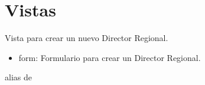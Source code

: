 \documentclass[letterpaper,10pt,spanish]{sphinxmanual}
\begin{document}
\section{Vistas}
\label{\detokenize{supervisores:vistas}}

\begin{fulllineitems}

\pysigstartsignatures
{}
\pysigstopsignatures
\sphinxAtStartPar
Vista para crear un nuevo Director Regional.
\begin{description}
\begin{itemize}
\item {} 
\sphinxAtStartPar
form: Formulario para crear un Director Regional.

\end{itemize}

\end{description}


\begin{fulllineitems}

\pysigstartsignatures
{}
\pysigstopsignatures
\end{fulllineitems}



\begin{fulllineitems}

\pysigstartsignatures
{}
\pysigstopsignatures
\sphinxAtStartPar
alias de 

\end{fulllineitems}



\begin{fulllineitems}

\pysigstartsignatures
{}
\pysigstopsignatures
\end{fulllineitems}



\begin{fulllineitems}

\pysigstartsignatures
{}
\pysigstopsignatures
\end{fulllineitems}


\end{fulllineitems}
\end{document}

